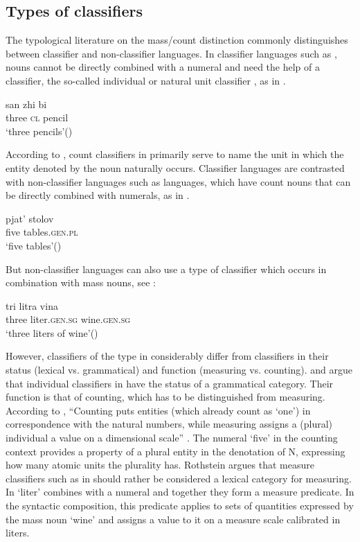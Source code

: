 \documentclass[output=paper]{langscibook}
\begin{document}
\subsection{Types of classifiers}

The typological literature on the mass/count distinction commonly distinguishes between classifier and non-classifier languages. In classifier languages such as , nouns cannot be directly combined with a numeral and need the help of a classifier, the so-called individual or natural unit classifier \citep{Krifka1989, Krifka1995}, as in .

\ea \label{ex:13}
\gll san zhi bi \\
    three \textsc{cl} pencil\\
\glt `three pencils'\hfill ()
\z

\noindent According to \cite{Cheng.Sybesma1999}, count classifiers in  primarily serve to name the unit in which the entity denoted by the noun naturally occurs. Classifier languages are contrasted with non-classifier languages such as  languages, which have count nouns that can be directly combined with numerals, as in .

\ea \label{ex:14}
\gll pjat' stolov \\
    five tables.\textsc{gen.pl}\\
\glt `five tables'\hfill ()
\z

\noindent But non-classifier languages can also use a type of classifier which occurs in combination with mass nouns, see :

\ea \label{ex:15}
\gll tri 	litra 	vina \\
    three	liter.\textsc{gen.sg}	wine.\textsc{gen.sg}\\
\glt `three liters of wine'\hfill ()
\z

\noindent However, classifiers of the type in  considerably differ from  classifiers in their status (lexical vs. grammatical) and function (measuring vs. counting). \cite{Cheng.Sybesma1999} and \cite{Li2013} argue that individual classifiers in  have the status of a grammatical category. Their function is that of counting, which has to be distinguished from measuring. According to \cite{Rothstein2010}, ``Counting puts entities (which already count as `one') in correspondence with the natural numbers, while measuring assigns a (plural) individual a value on a dimensional scale'' \citep[386]{Rothstein2010}. The numeral `five' in the counting context  provides a property of a plural entity in the denotation of N, expressing how many atomic units the plurality has. Rothstein argues that measure classifiers such as in  should rather be considered a lexical category for measuring. In  `liter' combines with a numeral and together they form a measure predicate. In the syntactic composition, this predicate applies to sets of quantities expressed by the mass noun `wine' and assigns a value to it on a measure scale calibrated in liters.
\end{document}
